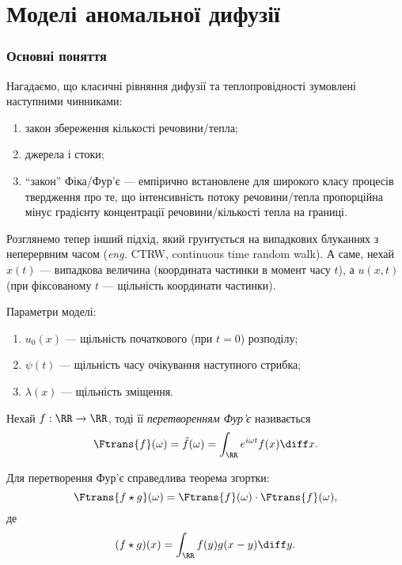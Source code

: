 \section{Моделі аномальної дифузії}

\subsubsection{Основні поняття}

Нагадаємо, що класичні рівняння дифузії та теплопровідності зумовлені наступними чинниками:
\begin{enumerate}
    \item закон збереження кількості речовини/тепла;
    \item джерела і стоки;
    \item ``закон'' Фіка/Фур'є --- емпірично встановлене для широкого класу процесів твердження про те, що інтенсивність потоку речовини/тепла пропорційна мінус градієнту концентрації речовини/кількості тепла на границі.
\end{enumerate}

Розглянемо тепер інший підхід, який грунтується на випадкових блуканнях з неперервним часом (\textit{eng.} CTRW, continuous time random walk). А саме, нехай $x(t)$ --- випадкова величина (координата частинки в момент часу $t$), а  $u(x, t)$ (при фіксованому $t$ --- щільність координати частинки). \medskip


Параметри моделі:
\begin{enumerate}
    \item $u_0(x)$ --- щільність початкового (при $t = 0$) розподілу;
    \item $\psi(t)$ --- щільність часу очікування наступного стрибка;
    \item $\lambda(x)$ --- щільність зміщення.
\end{enumerate}

\begin{definition}
    Нехай $f: \RR \to \RR$, тоді її \textit{перетворенням Фур'є} називається 
    \begin{equation}
        \Ftrans{f}(\omega) = \tilde{f}(\omega) = \int_\RR e^{i \omega t} f(x) \diff x.
    \end{equation}
\end{definition}

\begin{proposition}
    Для перетворення Фур'є справедлива теорема згортки:
    \begin{equation}
        \Ftrans{f \star g}(\omega) = \Ftrans{f}(\omega) \cdot \Ftrans{f}(\omega),
    \end{equation}
    де
    \begin{equation}
        (f \star g)(x) = \int_\RR f(y) g(x - y) \diff y.
    \end{equation}
\end{proposition}

